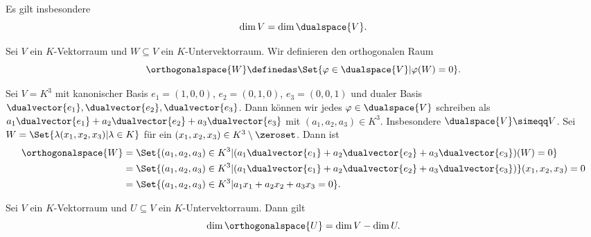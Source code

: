 \begin{bemerkung*}
  Es gilt insbesondere
  \begin{equation*}
    \dim{V}=\dim{\dualspace{V}}.
  \end{equation*}
\end{bemerkung*}
\begin{definition*}
  Sei \( V \) ein \( K \)-Vektorraum und \( W\subseteq V \) ein \( K \)-Untervektorraum. Wir definieren den orthogonalen Raum
  \begin{equation*}
    \orthogonalspace{W}\definedas \Set{\varphi\in \dualspace{V}|\varphi(W)=0}.
  \end{equation*}
\end{definition*}
\begin{beispiel*}
  Sei \( V=K^3 \) mit kanonischer Basis \( e_1=(1,0,0) \), \( e_2=(0,1,0) \), \( e_3=(0,0,1) \) und dualer Basis \( \dualvector{e_1}, \dualvector{e_2},\dualvector{e_3} \). Dann können wir jedes \( \varphi\in \dualspace{V} \) schreiben als \( a_1 \dualvector{e_1}+a_2\dualvector{e_2}+a_3\dualvector{e_3} \) mit \( (a_1,a_2,a_3)\in K^3 \). Insbesondere \( \dualspace{V}\simeqq V \). Sei \( W=\Set{\lambda(x_1,x_2,x_3)|\lambda\in K} \) für ein \( (x_1,x_2,x_3)\in K^3\setminus \zeroset \). Dann ist
  \begin{align*}
    \orthogonalspace{W}&=\Set{(a_1,a_2,a_3)\in K^3|(a_1\dualvector{e_1}+a_2\dualvector{e_2}+a_3\dualvector{e_3})(W)=0}\\
    &=\Set{(a_1,a_2,a_3)\in K^3|(a_1\dualvector{e_1}+a_2\dualvector{e_2}+a_3\dualvector{e_3})}(x_1,x_2,x_3)=0\\
    &=\Set{(a_1,a_2,a_3)\in K^3|a_1x_1+a_2x_2+a_3x_3=0}.
  \end{align*}
\end{beispiel*}
\begin{lemma}
  Sei \( V \) ein \( K \)-Vektorraum und \( U\subseteq V \) ein \( K \)-Untervektorraum. Dann gilt
  \begin{equation*}
    \dim{\orthogonalspace{U}}=\dim{V}-\dim{U}.
  \end{equation*}
\end{lemma}

